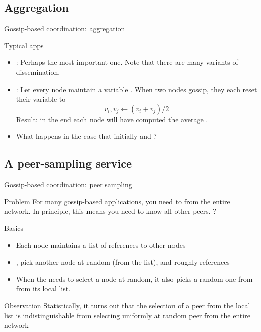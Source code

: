 \subsection{Aggregation}
\begin{slide}{Gossip-based coordination: aggregation}
  \begin{block}{Typical apps}
    \begin{itemize}
    \item {}: Perhaps the most important one. Note that there are many variants of
      dissemination.
    \item {}: Let every node  maintain a variable . When two nodes gossip, they
      each reset their variable to\[{v_i},{v_j} \leftarrow ({v_i} + {v_j}) /2\] Result: in the end
      each node will have computed the average .
    \item What happens in the case that initially  and ?
    \end{itemize}
  \end{block}
\end{slide}
\subsection{A peer-sampling service}
\begin{slide}{Gossip-based coordination: peer sampling}
  \begin{block}{Problem}
    For many gossip-based applications, you need to  from the entire
    network. In principle, this means you need to know all other peers. ?
  \end{block}
  \begin{block}{Basics}
    \begin{itemize}
    \item Each node maintains a list of  references to other nodes
    \item {}, pick another node at random (from the list), and  roughly
       references
    \item When the  needs to select a node at random, it also picks a random one from from
      its local list.
    \end{itemize}
  \end{block}
  \begin{alertblock}{Observation}
    Statistically, it turns out that the selection of a peer from the local list is indistinguishable from
    selecting uniformly at random peer from the entire network
  \end{alertblock}
\end{slide}
